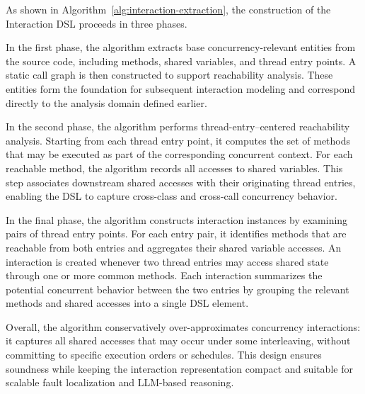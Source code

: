 As shown in Algorithm~\ref{alg:interaction-extraction}, the construction of the Interaction DSL proceeds in three phases.

In the first phase, the algorithm extracts base concurrency-relevant entities from the source code, including methods, shared variables, and thread entry points.
A static call graph is then constructed to support reachability analysis.
These entities form the foundation for subsequent interaction modeling and correspond directly to the analysis domain defined earlier.

In the second phase, the algorithm performs thread-entry–centered reachability analysis.
Starting from each thread entry point, it computes the set of methods that may be executed as part of the corresponding concurrent context.
For each reachable method, the algorithm records all accesses to shared variables.
This step associates downstream shared accesses with their originating thread entries, enabling the DSL to capture cross-class and cross-call concurrency behavior.

In the final phase, the algorithm constructs interaction instances by examining pairs of thread entry points.
For each entry pair, it identifies methods that are reachable from both entries and aggregates their shared variable accesses.
An interaction is created whenever two thread entries may access shared state through one or more common methods.
Each interaction summarizes the potential concurrent behavior between the two entries by grouping the relevant methods and shared accesses into a single DSL element.

Overall, the algorithm conservatively over-approximates concurrency interactions: it captures all shared accesses that may occur under some interleaving, without committing to specific execution orders or schedules.
This design ensures soundness while keeping the interaction representation compact and suitable for scalable fault localization and LLM-based reasoning.

